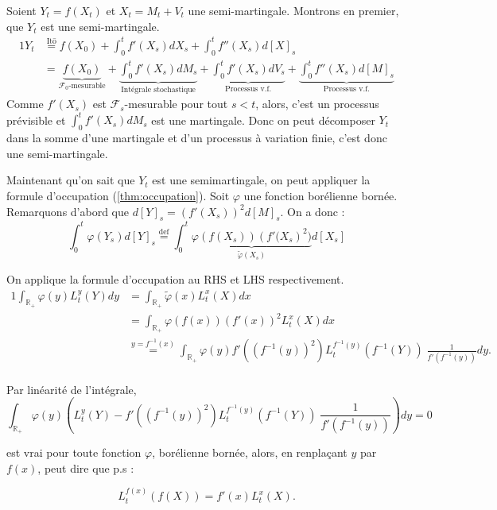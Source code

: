 \documentclass[openany]{book}
\makeatletter
\newcommand{\F}{\mathscr{F}}
\newcommand{\R}{\mathbb{R}}
\newcommand{\1}{\mathbbm{1}}
\renewenvironment{proof}[1][\textbf{\textit{Démonstration}}]{%
  \par\pushQED{\qed}%
  \normalfont\topsep6\p@\@plus6\p@\relax
  \trivlist\item[\hskip\labelsep
    #1\@addpunct{.}]\ignorespaces
}{%
  \popQED\endtrivlist\@endpefalse
}
\theoremstyle{thmfont}
\theoremstyle{deffont}
\theoremstyle{thmfont}
\theoremstyle{deffont}
\makeatother
\begin{document}
\begin{proof}
  Soient $Y_t = f(X_t)$ et $X_t = M_t + V_t$ une semi-martingale. Montrons en premier, que $Y_t$ est une semi-martingale. 
  \begin{alignat*}{1}
    Y_t &\overset{\text{Itō}}{=} f(X_0) + \int_0^t f'(X_s) dX_s + \int_0^t f''(X_s) d[X]_s\\
        &= \underbrace{f(X_0)}_{\F_0\text{-mesurable}} + \underbrace{\int_0^t f'(X_s) dM_s}_{\text{Intégrale stochastique}} + \underbrace{\int_0^t f'(X_s) dV_s}_{\text{Processus v.f.}} + \underbrace{\int_0^t f''(X_s) d[M]_s}_{\text{Processus v.f.}}
  \end{alignat*}
  Comme $f'(X_s)$ est $\F_s$-mesurable pour tout $s<t$, alors, c'est un processus prévisible et $\int_0^t f'(X_s) dM_s$ est une martingale.
  Donc on peut décomposer $Y_t$ dans la somme d'une martingale et d'un processus à variation finie, c'est donc une semi-martingale.


  
Maintenant qu'on sait que $Y_t$ est une semimartingale, on peut appliquer la formule d'occupation (\autoref{thm:occupation}). Soit $\varphi$ une fonction borélienne bornée. Remarquons d'abord que $d[Y]_s = \left(f'(X_s)\right)^2 d[M]_s$. On a donc :
$$  \int_0^t \varphi(Y_s) d[Y]_s \overset{\text{def}}{=} \int_0^t \underbrace{\varphi(f(X_s)) \left(f'(X_s\right)^2)}_{\tilde\varphi(X_s)} d[X_s]
$$

On applique la formule d'occupation au RHS et LHS respectivement.
\begin{alignat*}{1}
\int_{\R_+} \varphi(y) L_t^y(Y) dy &= \int_{\R_+} \tilde\varphi(x) L_t^x(X) dx\\
                         &= \int_{\R_+}\varphi(f(x)) \left(f'(x)\right)^2 L_t^x(X) dx\\
                      &\overset{y = f^{-1}(x)}{=} \int_{\R_+}\varphi(y) f'( (f^{-1}(y))^2) L_t^{f^{-1}(y)}(f^{-1}(Y)) \; \frac{1}{f'(f^{-1}(y))} dy.\\
\end{alignat*}

Par linéarité de l'intégrale, 
$$\int_{\R_+} \varphi(y) \left( L_t^y(Y) -  f'\left((f^{-1}(y))^2\right) L_t^{f^{-1}(y)}(f^{-1}(Y)) \; \frac{1}{f'(f^{-1}(y))}\right) dy  = 0 $$

est vrai pour toute fonction $\varphi$, borélienne bornée, alors, en renplaçant $y$ par $f(x)$, peut dire que p.s :

$$L_t^{f(x)}(f(X)) =  f'(x) L_t^{x}(X).$$
\end{proof}
\end{document}
